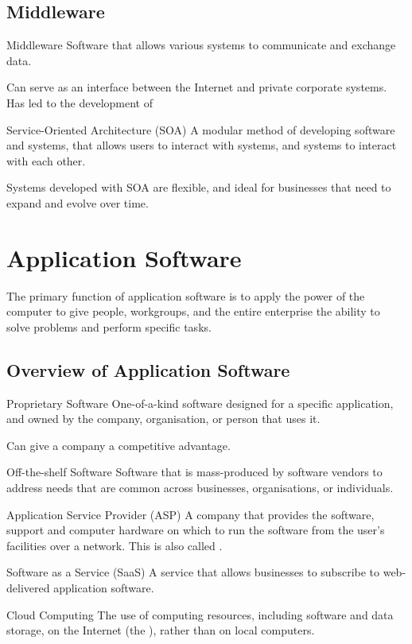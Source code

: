 \documentclass[\main/notes.tex]{subfiles}
\begin{document}
			\subsection{Middleware}
				\begin{definition}{Middleware}
					Software that allows various systems to communicate and exchange data.

					Can serve as an interface between the Internet and private corporate systems. Has led to the development of 
				\end{definition}
				\begin{definition}{Service-Oriented Architecture (SOA)}
					A modular method of developing software and systems, that allows users to interact with systems, and systems to interact with each other.

					Systems developed with SOA are flexible, and ideal for businesses that need to expand and evolve over time.
				\end{definition}

		\section{Application Software}
			The primary function of application software is to apply the power of the computer to give people, workgroups, and the entire enterprise the ability to solve problems and perform specific tasks.
			\subsection{Overview of Application Software}
				\begin{definition}{Proprietary Software}
					One-of-a-kind software designed for a specific application, and owned by the company, organisation, or person that uses it.

					Can give a company a competitive advantage.
				\end{definition}
				\begin{definition}{Off-the-shelf Software}
					Software that is mass-produced by software vendors to address needs that are common across businesses, organisations, or individuals.
				\end{definition}
				\begin{definition}{Application Service Provider (ASP)}
					A company that provides the software, support and computer hardware on which to run the software from the user's facilities over a network. This is also called .
				\end{definition}
				\begin{definition}{Software as a Service (SaaS)}
					A service that allows businesses to subscribe to web-delivered application software.
				\end{definition}
				\begin{definition}{Cloud Computing}
					The use of computing resources, including software and data storage, on the Internet (the ), rather than on local computers.
				\end{definition}
			\pagebreak
\end{document}
